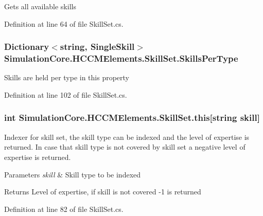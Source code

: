 Gets all available skills 



Definition at line 64 of file Skill\+Set.\+cs.

\subsubsection[{\texorpdfstring{Skills\+Per\+Type}{SkillsPerType}}]{\setlength{\rightskip}{0pt plus 5cm}Dictionary$<$string, {\bf Single\+Skill}$>$ Simulation\+Core.\+H\+C\+C\+M\+Elements.\+Skill\+Set.\+Skills\+Per\+Type\hspace{0.3cm}{\ttfamily [get]}}\hypertarget{class_simulation_core_1_1_h_c_c_m_elements_1_1_skill_set_a3f5bc6adc8bfa59b5a7c1d4ffbfcbad6}{}\label{class_simulation_core_1_1_h_c_c_m_elements_1_1_skill_set_a3f5bc6adc8bfa59b5a7c1d4ffbfcbad6}


Skills are held per type in this property 



Definition at line 102 of file Skill\+Set.\+cs.

\subsubsection[{\texorpdfstring{this[string skill]}{this[string skill]}}]{\setlength{\rightskip}{0pt plus 5cm}int Simulation\+Core.\+H\+C\+C\+M\+Elements.\+Skill\+Set.\+this\mbox{[}string skill\mbox{]}\hspace{0.3cm}{\ttfamily [get]}}\hypertarget{class_simulation_core_1_1_h_c_c_m_elements_1_1_skill_set_a120e0c79992eff5982844b8180c1db1b}{}\label{class_simulation_core_1_1_h_c_c_m_elements_1_1_skill_set_a120e0c79992eff5982844b8180c1db1b}


Indexer for skill set, the skill type can be indexed and the level of expertise is returned. In case that skill type is not covered by skill set a negative level of expertise is returned. 


\begin{DoxyParams}{Parameters}
{\em skill} & Skill type to be indexed\\
\hline
\end{DoxyParams}
\begin{DoxyReturn}{Returns}
Level of expertise, if skill is not covered -\/1 is returned
\end{DoxyReturn}


Definition at line 82 of file Skill\+Set.\+cs.

